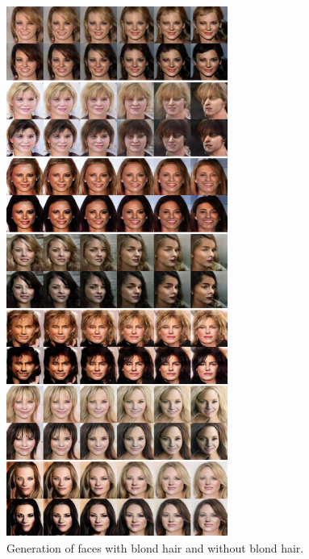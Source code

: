 \begin{figure}[thb!]
\centering
\includegraphics[trim=0in 0in 0in 0in, width=0.65\textwidth]{result_face_blondhair_big1.pdf}
\caption{Generation of faces with blond hair and without blond hair.}
\label{fig::result_blondhair1}
\end{figure}
